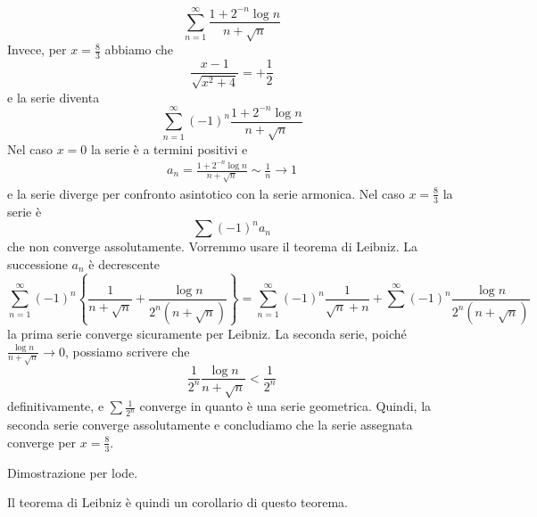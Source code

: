 \documentclass[a4paper]{article}
\begin{document}
{\[        \sum_{n=1}^\infty \frac{1 + 2^{-n} \log n}{n+\sqrt{n}}
    \]
    Invece, per \(x=\frac{8}{3}\) abbiamo che
    \[
        \frac{x-1}{\sqrt{x^2+4}} = +\frac{1}{2}
    \]
    e la serie diventa
    \[
        \sum_{n=1}^\infty {(-1)}^n \frac{1 + 2^{-n} \log n}{n+\sqrt{n}}
    \]
    Nel caso \(x=0\) la serie è a termini positivi e
    \begin{align*}
        a_n =  \frac{1 + 2^{-n} \log n}{n+\sqrt{n}} \sim \frac{1}{n} \to 1
    \end{align*}
    e la serie diverge per confronto asintotico con la serie armonica.
    Nel caso \(x=\frac{8}{3}\) la serie è
    \[
        \sum {(-1)}^n a_n
    \]
    che non converge assolutamente.
    Vorremmo usare il teorema di Leibniz. La successione \(a_n\)
    è decrescente
    \[
        \sum_{n=1}^\infty {(-1)}^n
        \left\{
            \frac{1}{n+\sqrt{n}} + \frac{\log n}{2^n (n+\sqrt{n})}
        \right\}
        = \sum_{n=1}^\infty {(-1)}^n \frac{1}{\sqrt{n} + n} + \sum^\infty
        {(-1)}^n \frac{\log n}{2^n (n+\sqrt{n})}
    \]
    la prima serie converge sicuramente per Leibniz.
    La seconda serie, poiché \(\frac{\log n}{n+\sqrt{n}} \to 0\), possiamo scrivere che
    \[
        \frac{1}{2^n} \frac{\log n}{n+\sqrt{n}} < \frac{1}{2^n}
    \]
    definitivamente,
    e \(\sum \frac{1}{2^n}\) converge in quanto è una serie geometrica.
    Quindi, la seconda serie converge assolutamente e concludiamo che la serie assegnata converge
    per \(x=\frac{8}{3}\).
}

Dimostrazione per lode.

Il teorema di Leibniz è quindi un corollario di questo teorema.

\end{document}
